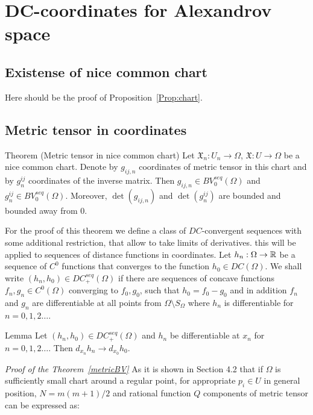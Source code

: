  
\section{DC-coordinates for Alexandrov space}

\subsection{Existense of nice common chart}\label{NiceChartProof}
Here should be the proof of 
Proposition~\ref{Prop:chart}.
\subsection{Metric tensor  in coordinates}\label{sec:metr-con}

\begin{thm}{Theorem (Metric tensor in nice common chart)}\label{metricBV}
Let
$\mathfrak X_n:U_n\to\Omega$,
$\mathfrak X:U\to\Omega$ be a nice common chart.
Denote by $g_{ij,n}$ coordinates of metric tensor in this chart
and by $g^{ij}_n$ coordinates of the inverse matrix. 
Then
$g_{ij,n}\in BV_0^{seq}(\Omega)$
and
$g^{ij}_n\in BV_0^{seq}(\Omega)$.
Moreover, $\det(g_{ij,n})$ and $\det(g^{ij}_n)$ are bounded and bounded away from 0.

\end{thm}




For the proof of this theorem we define a class of $DC$-convergent sequences with some additional restriction,
that allow to take limits of derivatives.
 this will be applied to sequences of distance functions
in coordinates.
Let $h_n:\Omega\to\mathbb{R}$ be a sequence of $C^0$ functions that
converges to the function $h_0\in DC(\Omega)$.
We shall write
$(h_n, h_0)\in DC_+^{seq}(\Omega)$
if
there are sequences of concave functions $f_n,g_n\in C^0(\Omega)$ converging to
$f_0,g_0$, such that 
$h_0=f_0-g_0$ and in addition $f_n$ and $g_n$
are  differentiable at all points
from $\Omega\setminus S_\Omega$ where $h_n$ is
differentiable for $n=0,1,2\dots$.

 
 
\begin{thm}{Lemma}\label{DC+}
Let
$(h_n, h_0)\in DC_+^{seq}(\Omega)$
and $h_n$ be
differentiable at
$x_n$ for $n=0,1,2\dots$.
Then $d_{x_n}h_n\to d_{x_0}h_0$. 
\end{thm}

{\it Proof of the Theorem~\ref{metricBV} }
As it is shown in \cite{PerDC} Section 4.2
that if $\Omega$ is sufficiently small chart around a regular point,
for appropriate $p_i\in U$ in general position, $N=m(m+1)/2$ and rational function $Q$ components of metric tensor can be expressed as:

